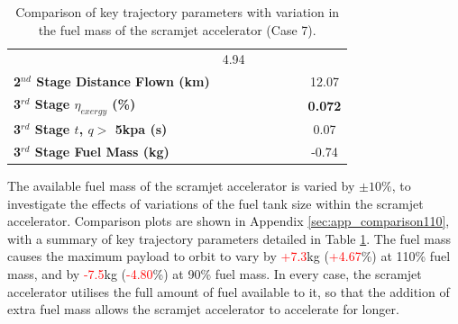 \begin{table}[!ht]
\begin{tabular}{l c c c c c c}
	&4.94
	\\
	\textbf{2$^{nd}$ Stage Distance Flown (km)}
	& \SecondDistmFuelNinetyNoReturn
	& \SecondDistmFuelNinetyFiveNoReturn
	& \SecondDistmFuelStandardNoReturn
	& \SecondDistmFuelOneHundredFiveNoReturn
	& \SecondDistmFuelOneHundredTenNoReturn
	&12.07
	\\
	\hline 
	\textbf{3$^{rd}$ Stage $\eta_{exergy}$ (\%)}
	& \textbf{\thirddExergyEffmFuelNinetyNoReturn}
	& \textbf{\thirddExergyEffmFuelNinetyFiveNoReturn}
	& \textbf{\thirddExergyEffmFuelStandardNoReturn}
	& \textbf{\thirddExergyEffmFuelOneHundredFiveNoReturn}
	& \textbf{\thirddExergyEffmFuelOneHundredTenNoReturn}
	& \textbf{0.072}
	\\
	\textbf{3$^{rd}$ Stage $t$, $q >$ 5kpa (s)}
	& \thirdqOverFivemFuelNinetyNoReturn
	& \thirdqOverFivemFuelNinetyFiveNoReturn
	& \thirdqOverFivemFuelStandardNoReturn
	& \thirdqOverFivemFuelOneHundredFiveNoReturn
	& \thirdqOverFivemFuelOneHundredTenNoReturn
	&0.07
	\\
	\textbf{3$^{rd}$ Stage Fuel Mass (kg)}
	& \thirdmFuelmFuelNinetyNoReturn
	& \thirdmFuelmFuelNinetyFiveNoReturn
	& \thirdmFuelmFuelStandardNoReturn
	& \thirdmFuelmFuelOneHundredFiveNoReturn
	& \thirdmFuelmFuelOneHundredTenNoReturn
	&-0.74
	\\
	\hline 
\end{tabular} 

\caption{Comparison of key trajectory parameters with variation in the fuel mass of the scramjet accelerator (Case 7).}
\label{tab:comparison110}
\end{table}

The available fuel mass of the scramjet accelerator is varied by $\pm 10\%$, to investigate the effects of variations of the fuel tank size within the scramjet accelerator. Comparison plots are shown in Appendix \ref{sec:app_comparison110}, with a summary of key trajectory parameters detailed in Table \ref{tab:comparison110}.
The fuel mass causes the maximum payload to orbit to vary by \textcolor{red}{+7.3}kg (\textcolor{red}{+4.67}\%) at 110\% fuel mass, and by \textcolor{red}{-7.5}kg (\textcolor{red}{-4.80}\%) at 90\% fuel mass. 
 In every case, the scramjet accelerator utilises the full amount of fuel available to it, so that the addition of extra fuel mass allows the scramjet accelerator to accelerate for longer. 

